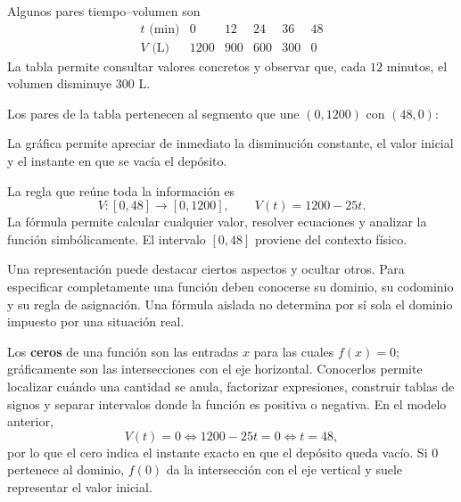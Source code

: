 \documentclass[10pt,a5paper]{article}
\begin{document}
\begin{ejemplo}
Algunos pares tiempo--volumen son
\[
\begin{array}{c|ccccc}
t\text{ (min)}&0&12&24&36&48\\ \hline
V\text{ (L)}&1200&900&600&300&0
\end{array}
\]
La tabla permite consultar valores concretos y observar que, cada $12$ minutos, el volumen disminuye $300$ L.
\end{ejemplo}

\begin{ejemplo}
Los pares de la tabla pertenecen al segmento que une $(0,1200)$ con $(48,0)$:
\begin{center}
\end{center}
La gráfica permite apreciar de inmediato la disminución constante, el valor inicial y el instante en que se vacía el depósito.
\end{ejemplo}

\begin{ejemplo}
La regla que reúne toda la información es
\[
V:[0,48]\to[0,1200],\qquad V(t)=1200-25t.
\]
La fórmula permite calcular cualquier valor, resolver ecuaciones y analizar la función simbólicamente. El intervalo $[0,48]$ proviene del contexto físico.
\end{ejemplo}

\begin{nota}
Una representación puede destacar ciertos aspectos y ocultar otros. Para especificar completamente una función deben conocerse su dominio, su codominio y su regla de asignación. Una fórmula aislada no determina por sí sola el dominio impuesto por una situación real.
\end{nota}

Los \textbf{ceros} de una función son las entradas $x$ para las cuales $f(x)=0$; gráficamente son las intersecciones con el eje horizontal. Conocerlos permite localizar cuándo una cantidad se anula, factorizar expresiones, construir tablas de signos y separar intervalos donde la función es positiva o negativa. En el modelo anterior,
\[
V(t)=0\iff1200-25t=0\iff t=48,
\]
por lo que el cero indica el instante exacto en que el depósito queda vacío. Si $0$ pertenece al dominio, $f(0)$ da la intersección con el eje vertical y suele representar el valor inicial.
\end{document}
